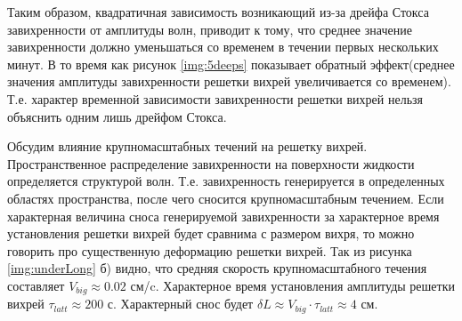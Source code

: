 Таким образом, квадратичная зависимость возникающий из-за дрейфа Стокса завихренности от амплитуды волн, приводит к тому, что среднее значение завихренности должно уменьшаться со временем в течении первых нескольких минут. В то время как рисунок \ref{img:5deeps} показывает обратный эффект(среднее значения амплитуды завихренности решетки вихрей увеличивается со временем). Т.е. характер временной зависимости завихренности решетки вихрей нельзя объяснить одним лишь дрейфом Стокса. 




Обсудим влияние крупномасштабных течений на решетку вихрей.
Пространственное распределение завихренности на поверхности жидкости определяется структурой волн. Т.е. завихренность генерируется в определенных областях пространства, после чего сносится крупномасштабным течением. Если характерная величина сноса генерируемой завихренности за характерное время установления решетки вихрей будет сравнима с размером вихря, то можно говорить про существенную деформацию решетки вихрей. Так из рисунка \ref{img:underLong} б) видно, что средняя скорость крупномасштабного течения составляет $V_{big} \approx 0.02$ см/c. Характерное время установления амплитуды решетки вихрей $\tau_{latt} \approx 200$ с. Характерный снос будет $\delta L \approx V_{big} \cdot \tau_{latt} \approx 4$ см.



